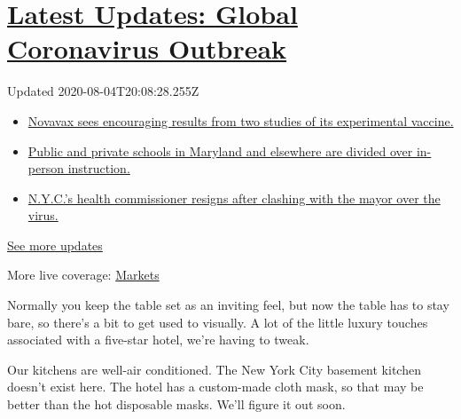 \hypertarget{latest-updates-global-coronavirus-outbreak}{%
\section{\texorpdfstring{\href{https://www.nytimes.com/2020/08/04/world/coronavirus-cases.html?action=click\&pgtype=Article\&state=default\&region=MAIN_CONTENT_1\&context=storylines_live_updates}{Latest
Updates: Global Coronavirus
Outbreak}}{Latest Updates: Global Coronavirus Outbreak}}\label{latest-updates-global-coronavirus-outbreak}}

Updated 2020-08-04T20:08:28.255Z

\begin{itemize}
\tightlist
\item
  \href{https://www.nytimes.com/2020/08/04/world/coronavirus-cases.html?action=click\&pgtype=Article\&state=default\&region=MAIN_CONTENT_1\&context=storylines_live_updates\#link-1228a480}{Novavax
  sees encouraging results from two studies of its experimental
  vaccine.}
\item
  \href{https://www.nytimes.com/2020/08/04/world/coronavirus-cases.html?action=click\&pgtype=Article\&state=default\&region=MAIN_CONTENT_1\&context=storylines_live_updates\#link-4825b93}{Public
  and private schools in Maryland and elsewhere are divided over
  in-person instruction.}
\item
  \href{https://www.nytimes.com/2020/08/04/world/coronavirus-cases.html?action=click\&pgtype=Article\&state=default\&region=MAIN_CONTENT_1\&context=storylines_live_updates\#link-4d1eafa8}{N.Y.C.'s
  health commissioner resigns after clashing with the mayor over the
  virus.}
\end{itemize}

\href{https://www.nytimes.com/2020/08/04/world/coronavirus-cases.html?action=click\&pgtype=Article\&state=default\&region=MAIN_CONTENT_1\&context=storylines_live_updates}{See
more updates}

More live coverage:
\href{https://www.nytimes.com/live/2020/08/04/business/stock-market-today-coronavirus?action=click\&pgtype=Article\&state=default\&region=MAIN_CONTENT_1\&context=storylines_live_updates}{Markets}

Normally you keep the table set as an inviting feel, but now the table
has to stay bare, so there's a bit to get used to visually. A lot of the
little luxury touches associated with a five-star hotel, we're having to
tweak.

Our kitchens are well-air conditioned. The New York City basement
kitchen doesn't exist here. The hotel has a custom-made cloth mask, so
that may be better than the hot disposable masks. We'll figure it out
soon.

